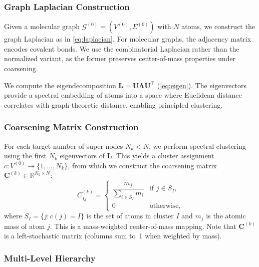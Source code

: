 \documentclass[12pt,a4paper]{article}
\providecommand{\R}{}
\renewcommand{\R}{\mathbb{R}}
\newcommand{\cG}{\mathcal{G}}
\newcommand{\Ct}{\bm{C}^{(k)}}
\newcommand{\Lap}{\bm{L}}
\begin{document}
\subsubsection{Graph Laplacian Construction}

Given a molecular graph $\cG^{(0)} = (V^{(0)}, E^{(0)})$ with $N$ atoms, we construct the graph Laplacian as in \cref{eq:laplacian}. For molecular graphs, the adjacency matrix encodes covalent bonds. We use the combinatorial Laplacian rather than the normalized variant, as the former preserves center-of-mass properties under coarsening.

We compute the eigendecomposition $\Lap = \bm{U} \bm{\Lambda} \bm{U}^\top$ (\cref{eq:eigen}). The eigenvectors provide a spectral embedding of atoms into a space where Euclidean distance correlates with graph-theoretic distance, enabling principled clustering.

\subsubsection{Coarsening Matrix Construction}

For each target number of super-nodes $N_k < N$, we perform spectral clustering using the first $N_k$ eigenvectors of $\Lap$. This yields a cluster assignment $c: V^{(0)} \to \{1, \ldots, N_k\}$, from which we construct the coarsening matrix $\Ct \in \R^{N_k \times N}$:
\begin{equation}\label{eq:coarsening_matrix}
    C^{(k)}_{Ij} = \begin{cases}
        \dfrac{m_j}{\sum_{i \in S_I} m_i} & \text{if } j \in S_I, \\[6pt]
        0 & \text{otherwise},
    \end{cases}
\end{equation}
where $S_I = \{j : c(j) = I\}$ is the set of atoms in cluster $I$ and $m_j$ is the atomic mass of atom $j$. This is a mass-weighted center-of-mass mapping. Note that $\Ct$ is a left-stochastic matrix (columns sum to~1 when weighted by mass).

\subsubsection{Multi-Level Hierarchy}
\end{document}
